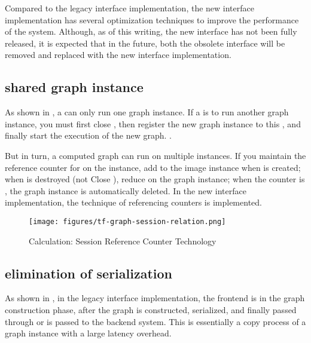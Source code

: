 \begin{content}

Compared to the legacy interface implementation, the new interface implementation has several optimization techniques to improve the performance of the system. Although, as of this writing, the new interface has not been fully released, it is expected that in the future, both the obsolete interface will be removed and replaced with the new interface implementation.

\subsection{shared graph instance}

As shown in , a  can only run one graph instance. If a  is to run another graph instance, you must first close , then register the new graph instance to this , and finally start the execution of the new graph. .

But in turn, a computed graph can run on multiple  instances. If you maintain the reference counter for  on the  instance, add  to the image instance when  is created; when  is destroyed (not Close ), reduce  on the graph instance; when the counter is , the graph instance is automatically deleted. In the new interface implementation, the technique of referencing counters is implemented.

\begin{figure}[H]
\centering
\texttt{[image: figures/tf-graph-session-relation.png]}
\caption{Calculation: Session Reference Counter Technology}
 \label{fig:tf-graph-session-relation}
\end{figure}

\subsection{elimination of serialization}

As shown in , in the legacy interface implementation, the frontend  is in the graph construction phase, after the graph is constructed, serialized, and finally passed through  or  is passed to the backend  system. This is essentially a copy process of a graph instance with a large latency overhead.


\end{content}
